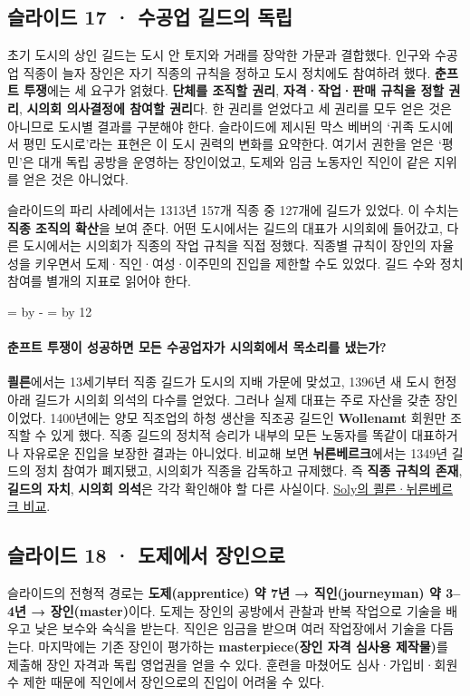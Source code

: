 \documentclass[10pt,a4paper]{article}
\newcommand{\ReserveQuestionSpace}{%
  \par\begingroup
  \dimen0=\pagegoal \advance\dimen0 by -\pagetotal
  \dimen2=\baselineskip \multiply\dimen2 by 12
  \ifdim\dimen0<\dimen2 \newpage\fi
  \endgroup}
\begin{document}
\subsection{슬라이드 17 · 수공업 길드의 독립}
초기 도시의 상인 길드는 도시 안 토지와 거래를 장악한 가문과 결합했다. 인구와 수공업 직종이 늘자 장인은 자기 직종의 규칙을 정하고 도시 정치에도 참여하려 했다. \textbf{춘프트 투쟁}에는 세 요구가 얽혔다. \textbf{단체를 조직할 권리}, \textbf{자격·작업·판매 규칙을 정할 권리}, \textbf{시의회 의사결정에 참여할 권리}다. 한 권리를 얻었다고 세 권리를 모두 얻은 것은 아니므로 도시별 결과를 구분해야 한다. 슬라이드에 제시된 막스 베버의 ‘귀족 도시에서 평민 도시로’라는 표현은 이 도시 권력의 변화를 요약한다. 여기서 권한을 얻은 ‘평민’은 대개 독립 공방을 운영하는 장인이었고, 도제와 임금 노동자인 직인이 같은 지위를 얻은 것은 아니었다.\par

슬라이드의 파리 사례에서는 1313년 157개 직종 중 127개에 길드가 있었다. 이 수치는 \textbf{직종 조직의 확산}을 보여 준다. 어떤 도시에서는 길드의 대표가 시의회에 들어갔고, 다른 도시에서는 시의회가 직종의 작업 규칙을 직접 정했다. 직종별 규칙이 장인의 자율성을 키우면서 도제·직인·여성·이주민의 진입을 제한할 수도 있었다. 길드 수와 정치 참여를 별개의 지표로 읽어야 한다.\par

\ReserveQuestionSpace
\paragraph{춘프트 투쟁이 성공하면 모든 수공업자가 시의회에서 목소리를 냈는가?}

\textbf{쾰른}에서는 13세기부터 직종 길드가 도시의 지배 가문에 맞섰고, 1396년 새 도시 헌정 아래 길드가 시의회 의석의 다수를 얻었다. 그러나 실제 대표는 주로 자산을 갖춘 장인이었다. 1400년에는 양모 직조업의 하청 생산을 직조공 길드인 \textbf{Wollenamt} 회원만 조직할 수 있게 했다. 직종 길드의 정치적 승리가 내부의 모든 노동자를 똑같이 대표하거나 자유로운 진입을 보장한 결과는 아니었다. 비교해 보면 \textbf{뉘른베르크}에서는 1349년 길드의 정치 참여가 폐지됐고, 시의회가 직종을 감독하고 규제했다. 즉 \textbf{직종 규칙의 존재}, \textbf{길드의 자치}, \textbf{시의회 의석}은 각각 확인해야 할 다른 사실이다. \href{https://doi.org/10.1017/S002085900800360X}{Soly의 쾰른·뉘른베르크 비교}.\par

\subsection{슬라이드 18 · 도제에서 장인으로}
슬라이드의 전형적 경로는 \textbf{도제(apprentice) 약 7년 → 직인(journeyman) 약 3–4년 → 장인(master)}이다. 도제는 장인의 공방에서 관찰과 반복 작업으로 기술을 배우고 낮은 보수와 숙식을 받는다. 직인은 임금을 받으며 여러 작업장에서 기술을 다듬는다. 마지막에는 기존 장인이 평가하는 \textbf{masterpiece(장인 자격 심사용 제작물)}를 제출해 장인 자격과 독립 영업권을 얻을 수 있다. 훈련을 마쳤어도 심사·가입비·회원 수 제한 때문에 직인에서 장인으로의 진입이 어려울 수 있다.\par
\end{document}

